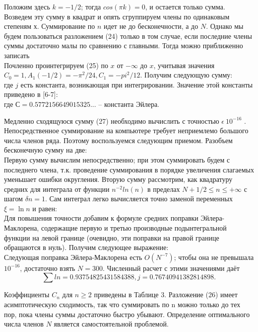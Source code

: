 \begin{equation}
\end{equation}
Положим здесь $k = -1/2$; тогда $cos(\pi k) = 0$, и остается только сумма. Возведем
эту сумму в квадрат и опять сгруппируем члены по одинаковым степеням $х$.
Суммирование по $n$ идет не до бесконечности, а до $N$. Однако мы будем
пользоваться разложением (24) только в том случае, если последние члены
суммы достаточно малы по сравнению с главными. Тогда можно приближенно
записать
\begin{equation}
\end{equation}
Почленно проинтегрируем (25) по $x$ от $-\infty$ до $x$, учитывая значения
$C_0=1, A_1(-1/2)=-\pi^2/24, C_1=-pi^2/12$. Получим следующую сумму:
\begin{equation}
\end{equation}
где $j$ есть константа, возникающая при интегрировании. Значение этой
константы приведено в [6-7]:
\begin{equation}
\end{equation}
где $С = 0.5772156649015325...$ – константа Эйлера.

Медленно сходящуюся сумму (27) необходимо вычислить с точностью $\epsilon~10^{-16}$ .
Непосредственное суммирование на компьютере требует неприемлемо
большого числа членов ряда. Поэтому воспользуемся следующим приемом.
Разобъем бесконечную сумму на две:
\begin{equation}
\end{equation}
Первую сумму вычислим непосредственно; при этом суммировать будем с
последнего члена, т.к. проведение суммирования в порядке увеличения
слагаемых уменьшает ошибки округления. Вторую сумму рассмотрим, как
квадратуру средних для интеграла от функции $n^{-2}ln(n)$ в пределах
$N + 1/ 2 \leqslant n \leqslant +\infty$ с шагом $\delta n=1$. Сам интеграл легко вычисляется точно
заменой переменных $\xi=\ln n $ и равен:
\begin{equation}
\end{equation}
Для повышения точности добавим к формуле средних поправки Эйлера-
Маклорена, содержащие первую и третью производные подынтегральной
функции на левой границе (очевидно, эти поправки на правой границе
обращаются в нуль). Получим следующее выражение:
\begin{equation}
\end{equation}
Следующая поправка Эйлера-Маклорена есть $O(N^{-7})$; чтобы она не превышала
$10^{-16}$, достаточно взять $N = 300$. Численный расчет с этими значениями даёт
\begin{equation}
\sum ln = 0.93754825431584388,
j = 0.76740941382814898.
\end{equation}

Коэффициенты $C_n$ для $n \geqslant 2$ приведены в Таблице 3. Разложение (26)
имеет асимптотическую сходимость, так что суммировать по n можно только
до тех пор, пока члены суммы достаточно быстро убывают. Определение
оптимального числа членов $N$ является самостоятельной проблемой.